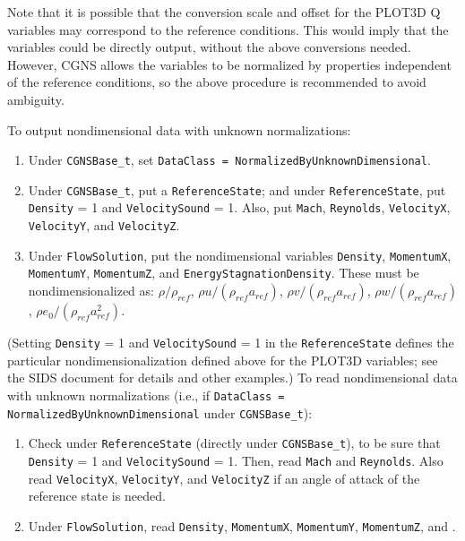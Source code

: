\documentclass[12pt]{article}
\begin{document}
Note that it is possible that the conversion scale and offset for the PLOT3D Q variables
may correspond to the reference conditions.  This would imply that the variables could
be directly output, without the above conversions needed.  However, CGNS allows the
variables to be normalized by properties independent of the reference conditions, so
the above procedure is recommended to avoid ambiguity.


 \label{sec:nondimdata}

To output nondimensional data with unknown normalizations:

\begin{enumerate}
\item Under {\tt CGNSBase\_t}, set {\tt DataClass = NormalizedByUnknownDimensional}.

\item Under {\tt CGNSBase\_t}, put a {\tt ReferenceState}; and under
{\tt ReferenceState}, put 
{\tt Density} = 1 and {\tt VelocitySound} = 1.
Also, put {\tt Mach}, {\tt Reynolds},
{\tt VelocityX}, {\tt VelocityY}, and {\tt VelocityZ}. 

\item Under {\tt FlowSolution}, put the nondimensional variables
{\tt Density}, {\tt MomentumX}, {\tt MomentumY},
{\tt MomentumZ}, and {\tt EnergyStagnationDensity}. 
These must be nondimensionalized as:
$\rho/\rho_{ref}$,
$\rho u/(\rho_{ref}a_{ref})$,
$\rho v/(\rho_{ref}a_{ref})$,
$\rho w/(\rho_{ref}a_{ref})$,
$\rho e_0/(\rho_{ref}a_{ref}^2)$.

\end{enumerate}

\noindent (Setting {\tt Density} = 1 and {\tt VelocitySound} = 1 in the
{\tt ReferenceState} defines the particular nondimensionalization
defined above for the PLOT3D variables; see the SIDS document \cite{ALLMARAS}
for details and other examples.)
To read nondimensional data with unknown normalizations
(i.e., if {\tt DataClass =} 
{\tt NormalizedByUnknownDimensional}
under {\tt CGNSBase\_t}):

\begin{enumerate}
\item Check under {\tt ReferenceState} (directly under {\tt CGNSBase\_t}),
to be sure that {\tt Density} = 1 and {\tt VelocitySound} = 1.
Then, read {\tt Mach} and {\tt Reynolds}.
Also read {\tt VelocityX}, {\tt VelocityY}, and {\tt VelocityZ}
if an angle of attack of the reference state is needed.

\item Under {\tt FlowSolution}, read
{\tt Density}, {\tt MomentumX}, {\tt MomentumY},
{\tt MomentumZ}, and 
.

\end{enumerate}
\end{document}
